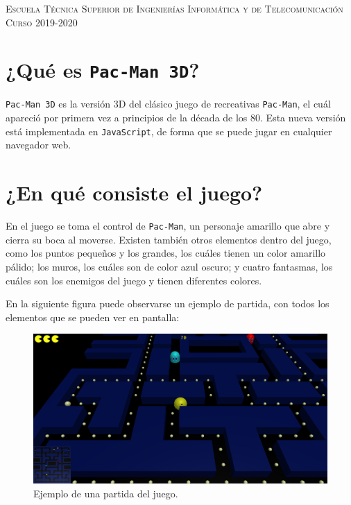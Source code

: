 \documentclass[11pt,a4paper]{article}
\begin{document}
\begin{titlepage}
\begin{minipage}{\textwidth}
\vspace{0.7cm}
\textsc{Escuela Técnica Superior de Ingenierías Informática y de Telecomunicación}\\
\vspace{1cm}
\textsc{Curso 2019-2020}
\end{minipage}
\end{titlepage}

\tableofcontents
\thispagestyle{empty}				%

\newpage

\setlength{\parskip}{1em}

\section{¿Qué es \texttt{Pac-Man 3D}?}

\texttt{Pac-Man 3D} es la versión 3D del clásico juego de recreativas \texttt{Pac-Man}, el cuál
apareció por primera vez a principios de la década de los 80. Esta nueva versión está implementada
en \texttt{JavaScript}, de forma que se puede jugar en cualquier navegador web.

\section{¿En qué consiste el juego?}

En el juego se toma el control de \texttt{Pac-Man}, un personaje amarillo que abre y cierra
su boca al moverse. Existen también otros elementos dentro del juego, como los puntos pequeños y
los grandes, los cuáles tienen un color amarillo pálido; los muros, los cuáles son de color azul
oscuro; y cuatro fantasmas, los cuáles son los enemigos del juego y tienen diferentes colores.

En la siguiente figura puede observarse un ejemplo de partida, con todos los elementos que se
pueden ver en pantalla:

\begin{figure}[H]
	\centering
	\includegraphics[scale=0.3]{img/pac-man-game}
	\caption{Ejemplo de una partida del juego.}
	\label{fig:pac-man}
\end{figure}
\end{document}
